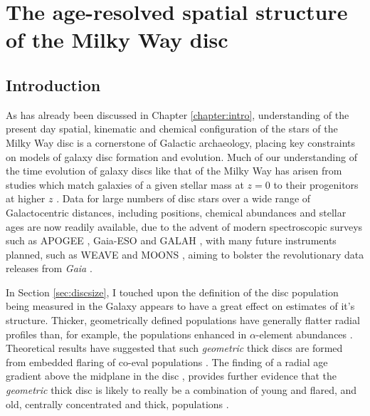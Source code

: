 \chapter{The age-resolved spatial structure of the Milky Way disc}
\label{chapter:apogeestruc}
\section{Introduction}

As has already been discussed in Chapter \ref{chapter:intro}, understanding of the present day spatial, kinematic and chemical configuration of the stars of the Milky Way disc is a cornerstone of Galactic archaeology, placing key constraints on models of galaxy disc formation and evolution. Much of our understanding of the time evolution of galaxy discs like that of the Milky Way has arisen from studies which match galaxies of a given stellar mass at $z=0$ to their progenitors at higher $z$ \citep[and therefore, lookback time, e.g.][]{2013ApJ...771L..35V,2015ApJ...803...26P,2016MNRAS.462.4495H}. 
Data for large numbers of disc stars over a wide range of Galactocentric distances, including positions, chemical abundances and stellar ages are now readily available, due to the advent of modern spectroscopic surveys such as APOGEE \citep{2015arXiv150905420M}, Gaia-ESO \citep{2012Msngr.147...25G} and GALAH \citep{2016arXiv160902822M}, with many future instruments planned, such as WEAVE \citep{2014SPIE.9147E..0LD} and MOONS \citep{2012SPIE.8446E..0SC}, aiming to bolster the revolutionary data releases from \emph{Gaia} \citep{2016A&A...595A...1G}.

In Section \ref{sec:discsize}, I touched upon the definition of the disc population being measured in the Galaxy appears to have a great effect on estimates of it's structure. Thicker, geometrically defined populations have generally flatter radial profiles \citep[e.g.][]{2008ApJ...673..864J} than, for example, the populations enhanced in $\alpha$-element abundances \citep[e.g.][]{2012ApJ...752...51C,2012ApJ...753..148B,2016ApJ...823...30B}. Theoretical results have suggested that such \emph{geometric} thick discs are formed from embedded flaring of co-eval populations  \citep{2015ApJ...804L...9M}. The finding of a radial age gradient above the midplane in the disc \citep[e.g.][]{2016arXiv160901168M}, provides further evidence that the \emph{geometric} thick disc is likely to really be a combination of young and flared, and old, centrally concentrated and thick, populations \citep[as predicted by the models of][]{2015ApJ...804L...9M}.

